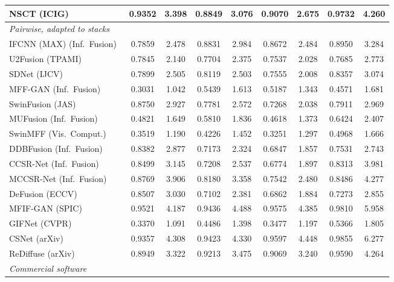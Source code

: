 \begin{table}[H]
{\begin{tabular}{lcccccccc}
NSCT (ICIG)~\cite{yang2007image} & 0.9352 & 3.398 & 0.8849 & 3.076 & 0.9070 & 2.675 & 0.9732 & 4.260 \\
\midrule
\multicolumn{9}{l}{\textit{Pairwise, adapted to stacks}} \\
IFCNN (MAX) (Inf.\ Fusion)~\cite{zhang2020ifcnn} & 0.7859 & 2.478 & 0.8831 & 2.984 & 0.8672 & 2.484 & 0.8950 & 3.284 \\
U2Fusion (TPAMI)~\cite{xu2020u2fusion} & 0.7845 & 2.140 & 0.7704 & 2.375 & 0.7537 & 2.028 & 0.7685 & 2.773 \\
SDNet (IJCV)~\cite{zhang2021sdnet} & 0.7899 & 2.505 & 0.8119 & 2.503 & 0.7555 & 2.008 & 0.8357 & 3.074 \\
MFF-GAN (Inf.\ Fusion)~\cite{zhang2021mff} & 0.3031 & 1.042 & 0.5439 & 1.613 & 0.5187 & 1.343 & 0.4571 & 1.681 \\
SwinFusion (JAS)~\cite{ma2022swinfusion} & 0.8750 & 2.927 & 0.7781 & 2.572 & 0.7268 & 2.038 & 0.7911 & 2.969 \\
MUFusion (Inf.\ Fusion)~\cite{cheng2023mufusion} & 0.4821 & 1.649 & 0.5810 & 1.836 & 0.4618 & 1.373 & 0.6424 & 2.407 \\
SwinMFF (Vis.\ Comput.)~\cite{xie2024swinmff} & 0.3519 & 1.190 & 0.4226 & 1.452 & 0.3251 & 1.297 & 0.4968 & 1.666 \\
DDBFusion (Inf.\ Fusion)~\cite{zhang2025ddbfusion} & 0.8382 & 2.877 & 0.7173 & 2.324 & 0.6847 & 1.857 & 0.7531 & 2.743 \\
CCSR-Net (Inf.\ Fusion)~\cite{ZHENG2025102974} & 0.8499 & 3.145 & 0.7208 & 2.537 & 0.6774 & 1.897 & 0.8313 & 3.981 \\
MCCSR-Net (Inf.\ Fusion)~\cite{ZHENG2025102974} & 0.8769 & 3.906 & 0.8180 & 3.358 & 0.7542 & 2.480 & 0.8486 & 4.277 \\
DeFusion (ECCV)~\cite{liang2022defusion} & 0.8507 & 3.030 & 0.7102 & 2.381 & 0.6862 & 1.884 & 0.7273 & 2.855 \\
MFIF-GAN (SPIC)~\cite{wang2021mfifgan} & 0.9521 & 4.187 & 0.9436 & 4.488 & 0.9575 & 4.385 & 0.9810 & 5.958 \\
GIFNet (CVPR)~\cite{cheng2025gifnet} & 0.3370 & 1.091 & 0.4486 & 1.398 & 0.3477 & 1.197 & 0.5366 & 1.805 \\
CSNet (arXiv)~\cite{csnet2026} & 0.9357 & 4.308 & 0.9423 & 4.330 & 0.9597 & 4.448 & 0.9855 & 6.277 \\
ReDiffuse (arXiv)~\cite{rediffuse2026} & 0.8949 & 3.322 & 0.9213 & 3.475 & 0.9069 & 3.240 & 0.9590 & 4.264 \\
\midrule
\multicolumn{9}{l}{\textit{Commercial software}} \\

\end{tabular}}
\end{table}
